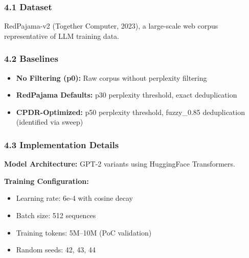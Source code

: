 
\subsubsection{4.1 Dataset}

RedPajama-v2 (Together Computer, 2023), a large-scale web corpus representative of LLM training data.

\begin{table}[htbp]
\centering
{}
\end{table}

\subsubsection{4.2 Baselines}

\begin{itemize}
\item \textbf{No Filtering (p0):} Raw corpus without perplexity filtering
\item \textbf{RedPajama Defaults:} p30 perplexity threshold, exact deduplication
\item \textbf{CPDR-Optimized:} p50 perplexity threshold, fuzzy\_0.85 deduplication (identified via sweep)
\end{itemize}

\subsubsection{4.3 Implementation Details}

\textbf{Model Architecture:} GPT-2 variants using HuggingFace Transformers.

\textbf{Training Configuration:}
\begin{itemize}
\item Learning rate: 6e-4 with cosine decay
\item Batch size: 512 sequences
\item Training tokens: 5M--10M (PoC validation)
\item Random seeds: 42, 43, 44
\end{itemize}

